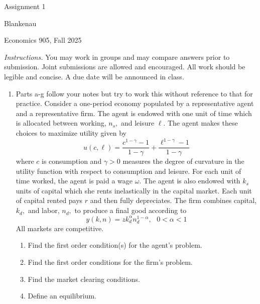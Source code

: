 \documentclass{article}
\begin{document}
\begin{center}
{\LARGE Assignment 1}
\end{center}

\noindent Blankenau

\noindent Economics 905, Fall 2025

\noindent \textit{Instructions.} You may work in groups and may compare
answers prior to submission. Joint submissions are allowed and encouraged.
All work should be legible and concise. A due date will be announced in
class.

\begin{enumerate}
\item Parts a-g follow your notes but try to work this without reference to
that for practice. Consider a one-period economy populated by a
representative agent and a representative firm. The agent is endowed with
one unit of time which is allocated between working, $n_{s},$ and leisure $%
\ell $. The agent makes these choices to maximize utility given by 
\begin{equation*}
u\left( c,\ell \right) =\frac{c^{1-\gamma }-1}{1-\gamma }+\frac{\ell
^{1-\gamma }-1}{1-\gamma }
\end{equation*}%
where $c$ is consumption and $\gamma >0$ measures the degree of curvature in
the utility function with respect to consumption and leisure. For each unit
of time worked, the agent is paid a wage $\omega $. The agent is also
endowed with $k_{s}$ units of capital which she rents inelastically in the
capital market. Each unit of capital rented pays $r$ and then fully
depreciates. The firm combines capital, $k_{d},$ and labor, $n_{d},$ to
produce a final good according to 
\begin{equation}
y\left( k,n\right) =zk_{d}^{\alpha }n_{d}^{1-\alpha },\text{ }0<\alpha <1
\label{out}
\end{equation}%
All markets are competitive.

\begin{enumerate}
\item Find the first order condition(s) for the agent's problem.

\item Find the first order conditions for the firm's problem.

\item Find the market clearing conditions.

\item Define an equilibrium.


\end{enumerate}
\end{enumerate}
\end{document}
